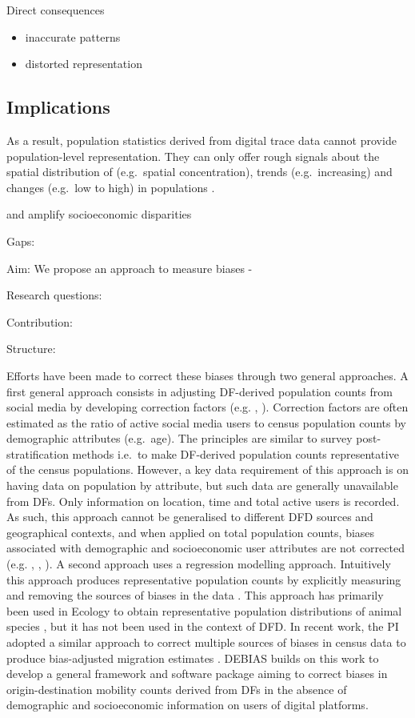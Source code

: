 \documentclass[]{rsos}%
\begin{document}
Direct consequences

\begin{itemize}
\item
  inaccurate patterns
\item
  distorted representation
\end{itemize}

\subsection{Implications}\label{implications}

As a result, population statistics derived from digital trace data
cannot provide population-level representation. They can only offer
rough signals about the spatial distribution of (e.g.~spatial
concentration), trends (e.g.~increasing) and changes (e.g.~low to high)
in populations \citep{rowe22-sensing-ukraine}.

and amplify socioeconomic disparities

Gaps:

Aim: We propose an approach to measure biases -

Research questions:

Contribution:

Structure:

Efforts have been made to correct these biases through two general
approaches. A first general approach consists in adjusting DF-derived
population counts from social media by developing correction factors
(e.g. \citep{yildiz17-twitter}, \citep{Hsiao24-bias}). Correction factors are
often estimated as the ratio of active social media users to census
population counts by demographic attributes (e.g.~age). The principles
are similar to survey post-stratification methods i.e.~to make
DF-derived population counts representative of the census populations.
However, a key data requirement of this approach is on having data on
population by attribute, but such data are generally unavailable from
DFs. Only information on location, time and total active users is
recorded. As such, this approach cannot be generalised to different DFD
sources and geographical contexts, and when applied on total population
counts, biases associated with demographic and socioeconomic user
attributes are not corrected (e.g. \citep{rodriguez-carrion18-biases},
\citep{schlosser21-biases}, \citep{pak22-correcting-bias}). A second approach uses
a regression modelling approach. Intuitively this approach produces
representative population counts by explicitly measuring and removing
the sources of biases in the data \citep{kramer-schadt13-bias-correction}.
This approach has primarily been used in Ecology to obtain
representative population distributions of animal species
\citep{zizka21-sampbias}, but it has not been used in the context of DFD. In
recent work, the PI adopted a similar approach to correct multiple
sources of biases in census data to produce bias-adjusted migration
estimates \citep{aparicio-castro23-bayesian}. DEBIAS builds on this work to
develop a general framework and software package aiming to correct
biases in origin-destination mobility counts derived from DFs in the
absence of demographic and socioeconomic information on users of digital
platforms.
\end{document}
